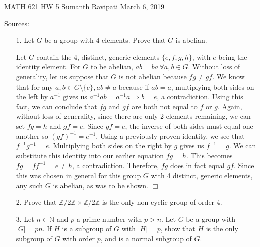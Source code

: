 \documentclass[12pt,letterpaper,reqno]{amsart}
\newcommand{\N}{\mathbb N}
\newcommand{\Z}{\mathbb Z}
\begin{document}
\thispagestyle{empty}
\begin{center}\large{
    MATH 621\quad
    HW 5\quad
    Sumanth Ravipati\quad
    March 6, 2019}
\end{center}
\vspace{.15in}
\begin{flushleft}
Sources: 
\end{flushleft}
\vspace{.25in}

\begin{enumerate}
\item[1.] Let $G$ be a group with 4 elements. Prove that $G$ is abelian.
\newline

\begin{flushleft}
Let $G$ contain the 4, distinct, generic elements $\{e, f, g, h\}$, with $e$ being the identity element. For $G$ to be abelian, $ab = ba\, \forall a, b \in G$. Without loss of generality, let us suppose that $G$ is not abelian because $fg \not= gf$. We know that for any $a, b \in G\setminus \{e\}, ab \not= a$ because if $ab = a$, multiplying both sides on the left by $a^{-1}$ gives us $a^{-1}ab = a^{-1}a \Rightarrow b = e$, a contradiction. Using this fact, we can conclude that $fg$ and $gf$ are both not equal to $f$ or $g$. Again, without loss of generality, since there are only 2 elements remaining, we can set $fg = h$ and $gf = e$. Since $gf = e$, the inverse of both sides must equal one another so $(gf)^{-1} = e^{-1}$. Using a previously proven identity, we see that $f^{-1}g^{-1} = e$. Multiplying both sides on the right by $g$ gives us $f^{-1} = g$. We can substitute this identity into our earlier equation $fg = h$. This becomes $fg = ff^{-1} = e \not= h$, a contradiction. Therefore, $fg$ does in fact equal $gf$. Since this was chosen in general for this group $G$ with 4 distinct, generic elements, any such $G$ is abelian, as was to be shown. $\Box$
\end{flushleft}

\newpage
\item[2.] Prove that $\Z/2\Z \times \Z/2\Z$ is the only non-cyclic group of order 4.
\newline

\begin{flushleft}

\end{flushleft}

\newpage
\item[3.] Let $n \in \N$ and $p$ a prime number with $p > n$. Let $G$ be a group with $|G| = pn$. If $H$ is a subgroup of $G$ with $|H| = p$, show that $H$ is the only subgroup of $G$ with order $p$, and is a normal subgroup of $G$.
\newline

\begin{flushleft}

\end{flushleft}

\end{enumerate}
\end{document}
